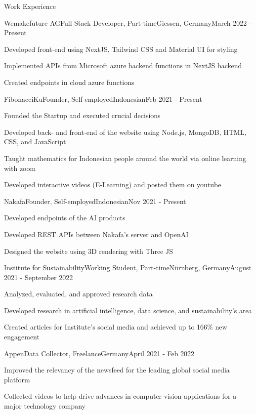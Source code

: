 \documentclass{article}
\newlength{\tabin}
\newlength{\secsep}
\newcommand{\lineunder}{\vspace*{-8pt} \\ \hspace*{-6pt} \hrulefill \\ \vspace*{-15pt}}
\newenvironment{tabbedsection}[1]{
  \begin{list}{}{
      \setlength{\itemsep}{0pt}
      \setlength{\labelsep}{0pt}
      \setlength{\labelwidth}{0pt}
      \setlength{\leftmargin}{\tabin}
      \setlength{\rightmargin}{\tabin}
      \setlength{\listparindent}{0pt}
      \setlength{\parsep}{0pt}
      \setlength{\parskip}{0pt}
      \setlength{\partopsep}{0pt}
      \setlength{\topsep}{#1}
    }
  \item[]
}{\end{list}}
\newenvironment{resume_section}[1]{
  \filbreak
  \vspace{2\secsep}
  \textsc{\large#1}
  \lineunder
  \begin{tabbedsection}{\secsep}
}{\end{tabbedsection}}
\newenvironment{subitems}{
  \renewcommand{\labelitemi}{-}
  \begin{itemize}
      \setlength{\labelsep}{1em}
}{\end{itemize}}
\newenvironment{resume_employer}[4]{
  \vspace{\secsep}
  \textbf{#1} \\ 
  \indent {\small #2} \hfill {\footnotesize#3 (#4)}
  \begin{tabbedsection}{0pt}
  \begin{subitems}
}{\end{subitems}\end{tabbedsection}}
\begin{document}
    \begin{resume_section}{Work Experience}
      \begin{resume_employer}{Wemakefuture AG}{Full Stack Developer, Part-time}{Giessen, Germany}{March 2022 - Present}
        \item Developed front-end using NextJS, Tailwind CSS and Material UI for styling
        \item Implemented APIs from Microsoft azure backend functions in NextJS backend
        \item Created endpoints in cloud azure functions
      \end{resume_employer}

      \begin{resume_employer}{FibonacciKu}{Founder, Self-employed}{Indonesian}{Feb 2021 - Present}
        \item Founded the Startup and executed crucial decisions
        \item Developed back- and front-end of the website using Node.js, MongoDB, HTML, CSS, and JavaScript
        \item Taught mathematics for Indonesian people around the world via online learning with zoom
        \item Developed interactive videos (E-Learning) and posted them on youtube
      \end{resume_employer}
      
      \begin{resume_employer}{Nakafa}{Founder, Self-employed}{Indonesian}{Nov 2021 - Present}
        \item Developed endpoints of the AI products
        \item Developed REST APIs between Nakafa's server and OpenAI
        \item Designed the website using 3D rendering with Three JS
      \end{resume_employer}

      \begin{resume_employer}{Institute for Sustainability}{Working Student, Part-time}{Nürnberg, Germany}{August 2021 - September 2022}
        \item Analyzed, evaluated, and approved research data
        \item Developed research in artificial intelligence, data science, and sustainability's area
        \item Created articles for Institute's social media and achieved up to 166\% new engagement
      \end{resume_employer}

        \begin{resume_employer}{Appen}{Data Collector, Freelance}{Germany}{April 2021 - Feb 2022}
          \item Improved the relevancy of the newsfeed for the leading global social media platform
          \item Collected videos to help drive advances in computer vision applications for a major technology company
        \end{resume_employer}
    \end{resume_section}
\end{document}
